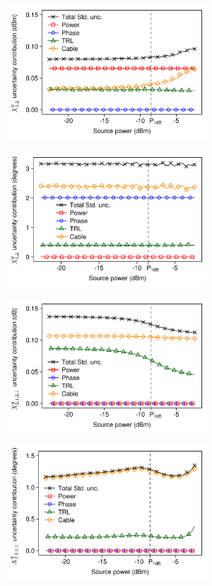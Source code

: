 \documentclass[../thesis/thesis.tex]{subfiles}
\begin{document}
\begin{refsection}
\begin{figure}
	\centering
	\begin{subfigure}{0.45\textwidth}
		\includegraphics[width=\linewidth,height=5cm]{fig5a}			
		\label{ch5_fig_fb12magsens}
	\end{subfigure}\hfil%
	\begin{subfigure}{0.45\textwidth}
		\includegraphics[width=\linewidth,height=5cm]{fig5b}
		\label{ch5_fig_fb12phasesens}
	\end{subfigure}
	\begin{subfigure}{0.45\textwidth}
		\includegraphics[width=\linewidth,height=5cm]{fig5c}
		\label{ch5_fig_s2121magsens}
	\end{subfigure}\hfil%
	\begin{subfigure}{0.45\textwidth}
		\includegraphics[width=\linewidth,height=5cm]{fig5d}	

\end{subfigure}
\end{figure}
\end{refsection}
\end{document}
